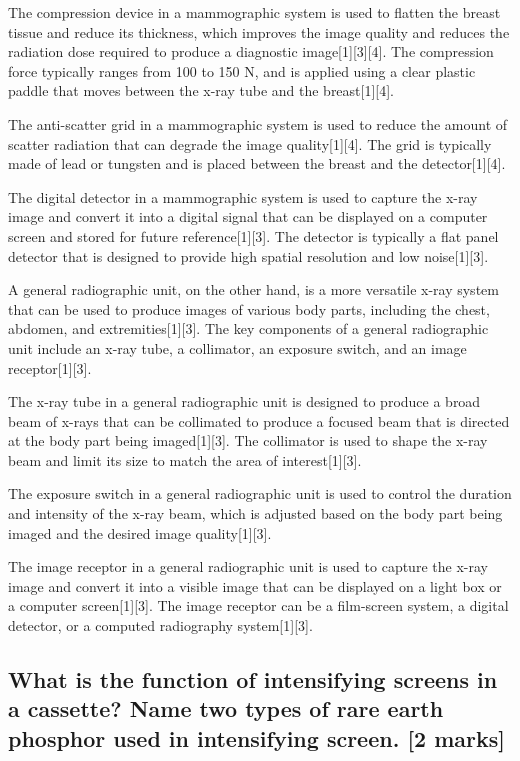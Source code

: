 \documentclass{assignment}
\begin{document}
\begin{problem}
{The compression device in a mammographic system is used to flatten the breast tissue and reduce its thickness, which improves the image quality and reduces the radiation dose required to produce a diagnostic image[1][3][4]. The compression force typically ranges from 100 to 150 N, and is applied using a clear plastic paddle that moves between the x-ray tube and the breast[1][4].

The anti-scatter grid in a mammographic system is used to reduce the amount of scatter radiation that can degrade the image quality[1][4]. The grid is typically made of lead or tungsten and is placed between the breast and the detector[1][4].

The digital detector in a mammographic system is used to capture the x-ray image and convert it into a digital signal that can be displayed on a computer screen and stored for future reference[1][3]. The detector is typically a flat panel detector that is designed to provide high spatial resolution and low noise[1][3].

A general radiographic unit, on the other hand, is a more versatile x-ray system that can be used to produce images of various body parts, including the chest, abdomen, and extremities[1][3]. The key components of a general radiographic unit include an x-ray tube, a collimator, an exposure switch, and an image receptor[1][3].

The x-ray tube in a general radiographic unit is designed to produce a broad beam of x-rays that can be collimated to produce a focused beam that is directed at the body part being imaged[1][3]. The collimator is used to shape the x-ray beam and limit its size to match the area of interest[1][3].

The exposure switch in a general radiographic unit is used to control the duration and intensity of the x-ray beam, which is adjusted based on the body part being imaged and the desired image quality[1][3].

The image receptor in a general radiographic unit is used to capture the x-ray image and convert it into a visible image that can be displayed on a light box or a computer screen[1][3]. The image receptor can be a film-screen system, a digital detector, or a computed radiography system[1][3].
}
\subsection{What is the function of intensifying screens in a cassette? Name two types of rare earth phosphor used in intensifying screen. [2 marks]}

\end{problem}
\end{document}
